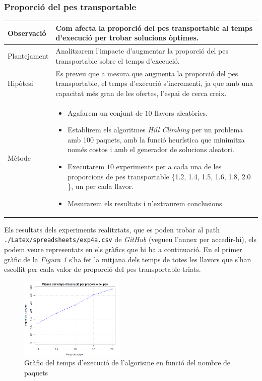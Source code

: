 \documentclass[a4paper]{article}
\begin{document}
	\subsubsection{Proporció del pes transportable}
	\begin{table}[ht]
		\centering
		\begin{tabular}{|l|p{10cm}|}
			\hline
			Observació & Com afecta la proporció del pes transportable al temps d'execució per trobar solucions òptimes.\\
			\hline
			Plantejament & Analitzarem l'impacte d'augmentar la proporció del pes transportable sobre el temps d'execució. \\
			\hline
			Hipòtesi & Es preveu que a mesura que augmenta la proporció del pes transportable, el temps d'execució s'incrementi, ja que amb una capacitat més gran de les ofertes, l'espai de cerca creix.\\
			\hline
			Mètode &
			\begin{itemize}
				\item Agafarem un conjunt de $10$ llavors aleatòries.
				\item Establirem els algoritmes \textit{Hill Climbing} per un problema amb 100 paquets, amb la funció heurística que minimitza només costos i amb el generador de solucions aleatori.
				\item Executarem $10$ experiments per a cada una de les proporcions de pes transportable \{1.2, 1.4, 1.5, 1.6, 1.8, 2.0 \}, un per cada llavor.
				\item Mesurarem els resultats i n'extraurem conclusions.
			\end{itemize} \\
			\hline
		\end{tabular}
		\label{tab:exp4a_apartats}
	\end{table}

	Els resultats dels experiments realitztats, que es poden trobar al path \texttt{./Latex/spreadsheets/exp4a.csv} de \textit{GitHub} (vegueu l'annex per accedir-hi), els podem veure representats en els gràfics que hi ha a continuació. En el primer gràfic de la \textit{Figura \ref{fig:exp4a_grafic_lineal}} s'ha fet la mitjana dels temps de totes les llavors que s'han escollit per cada valor de proporció del pes transportable triats.\\ 
	
	\begin{figure}[H]
		\centering
		\includegraphics[width=0.45\textwidth]{images/exp4a_grafic_lineal.png}
		\caption{Gràfic del temps d'execució de l'algorisme en funció del nombre de paquets}
		\label{fig:exp4a_grafic_lineal}
	\end{figure}
	
\end{document}
